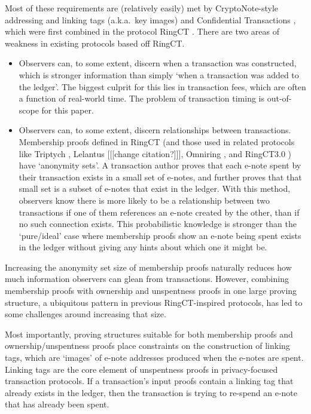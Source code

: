 Most of these requirements are (relatively easily) met by CryptoNote-style addressing and linking tags (a.k.a.\ key images) \cite{cryptoNoteWhitePaper} and Confidential Transactions \cite{maxwell-ct-2}, which were first combined in the protocol RingCT \cite{MRL-0005-ringct}. There are two areas of weakness in existing protocols based off RingCT.

\begin{itemize}
    \item Observers can, to some extent, discern when a transaction was constructed, which is stronger information than simply `when a transaction was added to the ledger'. The biggest culprit for this lies in transaction fees, which are often a function of real-world time. The problem of transaction timing is out-of-scope for this paper.
    \item Observers can, to some extent, discern relationships between transactions. Membership proofs defined in RingCT (and those used in related protocols like Triptych \cite{triptych-preprint}, Lelantus \cite{lelantus-preprint} [[[change citation?]]], Omniring \cite{omniring-paper}, and RingCT3.0 \cite{ringct3-preprint}) have `anonymity sets'. A transaction author proves that each e-note spent by their transaction exists in a small set of e-notes, and further proves that that small set is a subset of e-notes that exist in the ledger. With this method, observers know there is more likely to be a relationship between two transactions if one of them references an e-note created by the other, than if no such connection exists. This probabilistic knowledge is stronger than the `pure/ideal' case where membership proofs show an e-note being spent exists in the ledger without giving any hints about which one it might be.
\end{itemize}

Increasing the anonymity set size of membership proofs naturally reduces how much information observers can glean from transactions. However, combining membership proofs with ownership and unspentness proofs in one large proving structure, a ubiquitous pattern in previous RingCT-inspired protocols, has led to some challenges around increasing that size.

Most importantly, proving structures suitable for both membership proofs and ownership/unspentness proofs place constraints on the construction of linking tags, which are `images' of e-note addresses produced when the e-notes are spent. Linking tags are the core element of unspentness proofs in privacy-focused transaction protocols. If a transaction's input proofs contain a linking tag that already exists in the ledger, then the transaction is trying to re-spend an e-note that has already been spent.

